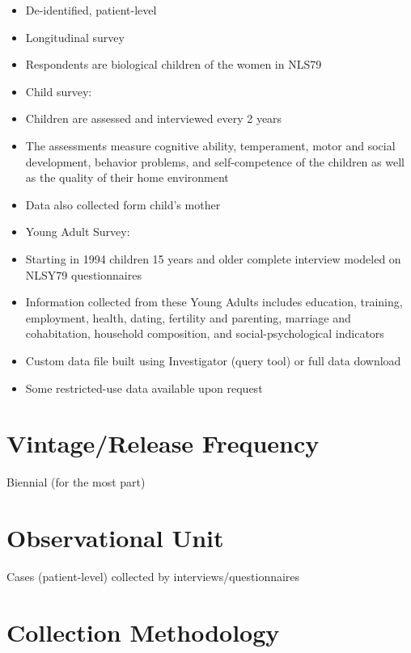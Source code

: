 \documentclass[
]{book}
\providecommand{\tightlist}{%
  \setlength{\itemsep}{0pt}\setlength{\parskip}{0pt}}
\begin{document}
\begin{itemize}
\tightlist
\item
  De-identified, patient-level
\item
  Longitudinal survey
\item
  Respondents are biological children of the women in NLS79
\item
  Child survey:
\item
  Children are assessed and interviewed every 2 years
\item
  The assessments measure cognitive ability, temperament, motor and social development, behavior problems, and self-competence of the children as well as the quality of their home environment
\item
  Data also collected form child's mother
\item
  Young Adult Survey:
\item
  Starting in 1994 children 15 years and older complete interview modeled on NLSY79 questionnaires
\item
  Information collected from these Young Adults includes education, training, employment, health, dating, fertility and parenting, marriage and cohabitation, household composition, and social-psychological indicators
\item
  Custom data file built using Investigator (query tool) or full data download
\item
  Some restricted-use data available upon request
\end{itemize}

\hypertarget{vintagerelease-frequency-59}{%
\section{Vintage/Release Frequency}\label{vintagerelease-frequency-59}}

Biennial (for the most part)

\hypertarget{observational-unit-59}{%
\section{Observational Unit}\label{observational-unit-59}}

Cases (patient-level) collected by interviews/questionnaires

\hypertarget{collection-methodology-59}{%
\section{Collection Methodology}\label{collection-methodology-59}}
\end{document}
